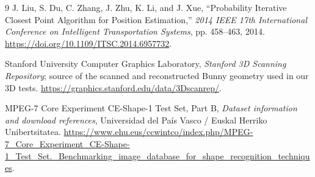 \documentclass[11pt,a4paper]{article}
\begin{document}
\begin{thebibliography}{9}
J. Liu, S. Du, C. Zhang, J. Zhu, K. Li, and J. Xue,
``Probability Iterative Closest Point Algorithm for Position Estimation,''
\emph{2014 IEEE 17th International Conference on Intelligent Transportation Systems},
pp. 458--463, 2014.
\url{https://doi.org/10.1109/ITSC.2014.6957732}.

Stanford University Computer Graphics Laboratory,
\emph{Stanford 3D Scanning Repository}; source of the scanned and reconstructed Bunny geometry used in our 3D tests.
\url{https://graphics.stanford.edu/data/3Dscanrep/}.

MPEG-7 Core Experiment CE-Shape-1 Test Set, Part B,
\emph{Dataset information and download references},
Universidad del Pa\'is Vasco / Euskal Herriko Unibertsitatea.
\url{https://www.ehu.eus/ccwintco/index.php/MPEG-7_Core_Experiment_CE-Shape-1_Test_Set._Benchmarking_image_database_for_shape_recognition_techniques}.
\end{thebibliography}
\end{document}
